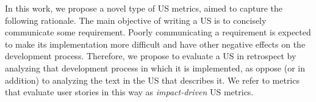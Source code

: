 In this work, we propose a novel type of US metrics, aimed to capture the following rationale.  
The main objective of writing a US is to concisely communicate some requirement. %
Poorly communicating a requirement is expected to make its implementation more difficult and have other negative effects on the development process. 
Therefore, we propose to evaluate a US in retrospect by analyzing that development process in which it is implemented, as oppose (or in addition) to  analyzing the text in the US that describes it. 
We refer to metrics that evaluate user stories in this way as \emph{impact-driven} US metrics. 










